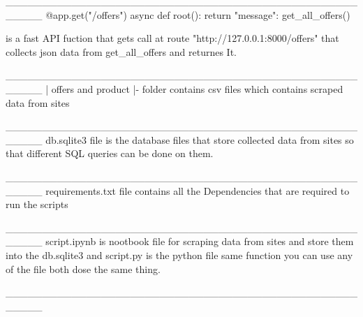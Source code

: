     _____________________________________________________
    @app.get("/offers")
    async def root():
        return {"message": get_all_offers()}

    is a fast API fuction that gets call at route "http://127.0.0.1:8000/offers" that collects json data from get_all_offers and returnes It.

_____________________________________________________
| offers and product |- folder contains csv files which contains scraped data from sites

_____________________________________________________
db.sqlite3 file is the database files that store collected data from sites so that different SQL queries can be done on them.

_____________________________________________________
requirements.txt file contains all the Dependencies that are required to run the scripts

_____________________________________________________
script.ipynb is nootbook file for scraping data from sites and store them into the db.sqlite3 and script.py is the python file same function
you can use any of the file both dose the same thing.

_____________________________________________________
